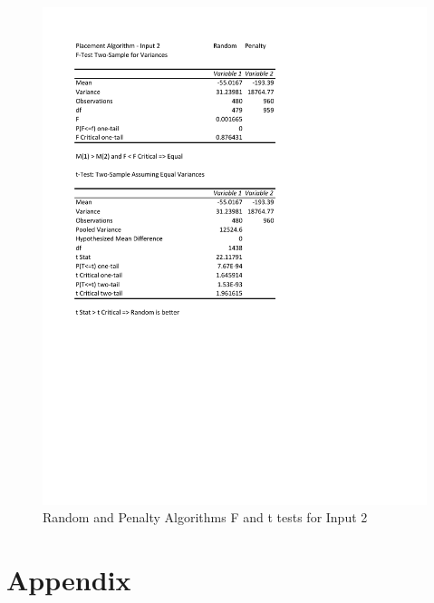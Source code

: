 \documentclass[times]{article}
\begin{document}
	\begin{figure}
		\caption{Random and Penalty Algorithms F and t tests for Input 2}
		\label{fig:random_penalty2}
		\includegraphics[width=\textwidth]{./t_test/Random_Penalty2}
	\end{figure}
%	


	\section{Appendix}
	
		
\end{document}
